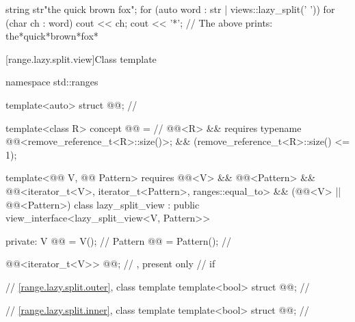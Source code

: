 \pnum
\begin{example}
\begin{codeblock}
string str{"the quick brown fox"};
for (auto word : str | views::lazy_split(' ')) {
  for (char ch : word)
    cout << ch;
  cout << '*';
}
// The above prints: the*quick*brown*fox*
\end{codeblock}
\end{example}

[range.lazy.split.view]{Class template }

%
%
%
%
\begin{codeblock}
namespace std::ranges {
  template<auto> struct @@;                       // \expos

  template<class R>
  concept @@ =                                          // \expos
    @@<R> &&
    requires { typename @@<remove_reference_t<R>::size()>; } &&
    (remove_reference_t<R>::size() <= 1);

  template<@@ V, @@ Pattern>
    requires @@<V> && @@<Pattern> &&
             @@<iterator_t<V>, iterator_t<Pattern>, ranges::equal_to> &&
             (@@<V> || @@<Pattern>)
  class lazy_split_view : public view_interface<lazy_split_view<V, Pattern>> {
  private:
    V @@ = V();                                              // \expos
    Pattern @@ = Pattern();                               // \expos

    @@<iterator_t<V>> @@;              // \expos, present only
                                                                // if 

    // \ref{range.lazy.split.outer}, class template 
    template<bool> struct @@;                       // \expos

    // \ref{range.lazy.split.inner}, class template 
    template<bool> struct @@;                       // \expos

}}
\end{codeblock}
